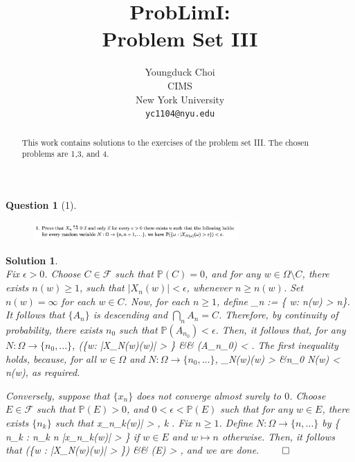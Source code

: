\documentclass{article} %
\title{ProbLimI: \\
Problem Set III}
\author{
Youngduck Choi \\
CIMS \\
New York University\\
\texttt{yc1104@nyu.edu} \\
}
\def\eQb#1\eQe{\begin{eqnarray*}#1\end{eqnarray*}}
\theoremstyle{quest}
\newtheorem*{question}{Question}
\newtheorem*{solution}{Solution}
\begin{document}
\maketitle

\begin{abstract}
This work contains solutions to the exercises of the problem set III. The
chosen problems are 1,3, and 4.
\end{abstract}

\bigskip

\begin{question}[1]
\hfill
\begin{figure}[h!]
  \centering
    \includegraphics[width=0.7\textwidth]{prob-e3-p1.png}
\end{figure}
\end{question}
\begin{solution} \hfill \\
Fix $\epsilon > 0$.  
Choose $C \in \mathscr{F}$ such that $\mathbb{P}(C) = 0$,
and for any $w \in \Omega \setminus C$, 
there exists $n(w) \geq 1$, such that $|X_n(w)| < \epsilon$, whenever $n \geq n(w)$.
Set $n(w) = \infty$ for each $w \in C$.
Now, for each $n \geq 1$, define
\eQb
A_n := \{ w: n(w) > n\}. 
\eQe 
It follows that $\{ A_n \}$ is descending and $\bigcap_n A_n = C$. Therefore, by
continuity of probability, there exists $n_0$ such that $\mathbb{P}(A_{n_0}) < 
\epsilon$. Then, it follows that, for any $N:\Omega \to \{ n_0,...\}$, 
\eQb
\mathbb{P}(\{w: |X_{N(w)}(w)| > \epsilon\} &\leq& (A_{n_0}) < \epsilon. 
\eQe  
The first inequality holds, because, for all $w \in \Omega$ and $N:\Omega 
\to \{n_0,...\}$,
\eQb
X_{N(w)}(w) > \epsilon &\implies n_0 \leq N(w) < n(w), 
\eQe
as required. 

\bigskip

Conversely, suppose that $\{x_n\}$ does not converge almost surely to $0$. Choose
$E \in \mathscr{F}$ such that $\mathbb{P}(E) > 0$, and $0 < \epsilon < \mathbb{P}(E)$
such that for any $w \in E$, there exists $\{n_k\}$ such that
\eQb
|x_{n_k}(w)| > \epsilon , \>\>  \>\> k .
\eQe  
Fix $n \geq 1$. Define $N: \Omega \to \{n,...\}$ by 
\eQb
w \mapsto \inf\{ n_k \>: \> 
n_k \geq n \>\>  \>\> |x_{n_k}(w)| > \epsilon \} 
\eQe
if $w \in E$ and $w \mapsto n$ otherwise.
Then, it follows that
\eQb
\mathbb{P}(\{w : |X_{N(w)}(w)| > \epsilon\}) &\geq& (E) > \epsilon, 
\eQe
and we are done. \hfill $\qed$


\end{solution}
\end{document}
